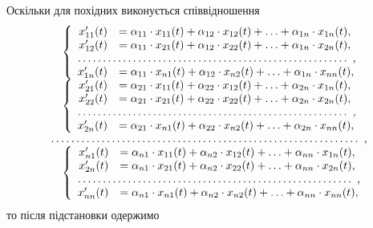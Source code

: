 Оскільки для похідних виконується співвідношення
\begin{equation*}
\begin{array}{rl}
	& \left\{
		\begin{array}{rl}
			x_{11}'(t) &= \alpha_{11} \cdot x_{11} (t) + \alpha_{12} \cdot x_{12}(t) + \ldots + \alpha_{1n} \cdot x_{1n}(t), \\
			x_{12}'(t) &= \alpha_{11} \cdot x_{21} (t) + \alpha_{12} \cdot x_{22}(t) + \ldots + \alpha_{1n} \cdot x_{2n}(t), \\
			\hdotsfor{2}, \\
			x_{1n}'(t) &= \alpha_{11} \cdot x_{n1} (t) + \alpha_{12} \cdot x_{n2}(t) + \ldots + \alpha_{1n} \cdot x_{nn}(t),
		\end{array}
	\right. \\
	& \left\{
		\begin{array}{rl}
			x_{21}'(t) &= \alpha_{21} \cdot x_{11} (t) + \alpha_{22} \cdot x_{12}(t) + \ldots + \alpha_{2n} \cdot x_{1n}(t), \\
			x_{22}'(t) &= \alpha_{21} \cdot x_{21} (t) + \alpha_{22} \cdot x_{22}(t) + \ldots + \alpha_{2n} \cdot x_{2n}(t), \\
			\hdotsfor{2}, \\
			x_{2n}'(t) &= \alpha_{21} \cdot x_{n1} (t) + \alpha_{22} \cdot x_{n2}(t) + \ldots + \alpha_{2n} \cdot x_{nn}(t),
		\end{array}
	\right. \\
	\hdotsfor{2}, \\
	& \left\{
		\begin{array}{rl}
			x_{n1}'(t) &= \alpha_{n1} \cdot x_{11} (t) + \alpha_{n2} \cdot x_{12}(t) + \ldots + \alpha_{nn} \cdot x_{1n}(t), \\
			x_{2n}'(t) &= \alpha_{n1} \cdot x_{21} (t) + \alpha_{n2} \cdot x_{22}(t) + \ldots + \alpha_{nn} \cdot x_{2n}(t), \\
			\hdotsfor{2}, \\
			x_{nn}'(t) &= \alpha_{n1} \cdot x_{n1} (t) + \alpha_{n2} \cdot x_{n2}(t) + \ldots + \alpha_{nn} \cdot x_{nn}(t),
		\end{array}
	\right.
\end{array}
\end{equation*}
то після підстановки одержимо
